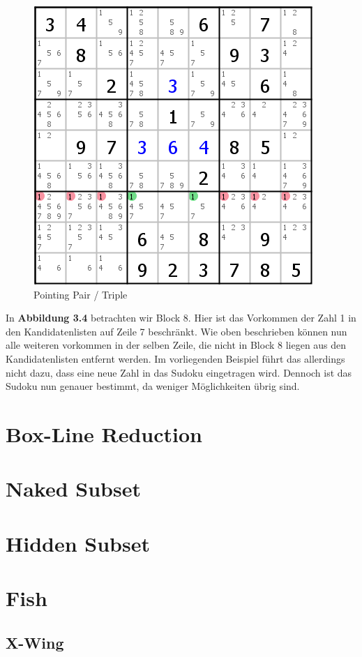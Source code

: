 \documentclass[accentcolor=tud6b,11pt,paper=a4]{tudreport}
\begin{document}
\begin{figure}[h]
\begin{center}
\includegraphics{./img/pointing_pair_triple.png}
\caption{Pointing Pair / Triple}
\end{center}
\end{figure}

In \textbf{Abbildung 3.4} betrachten wir Block 8. Hier ist das Vorkommen der Zahl 1 in den Kandidatenlisten auf Zeile 7 beschränkt. Wie oben beschrieben können nun alle weiteren vorkommen in der selben Zeile, die nicht in Block 8 liegen aus den Kandidatenlisten entfernt werden. Im vorliegenden Beispiel führt das allerdings nicht dazu, dass eine neue Zahl in das Sudoku eingetragen wird. Dennoch ist das Sudoku nun genauer bestimmt, da weniger Möglichkeiten übrig sind.

\newpage
\section{Box-Line Reduction}
\section{Naked Subset}
\section{Hidden Subset}
\section{Fish}
\subsection{X-Wing}
\end{document}
